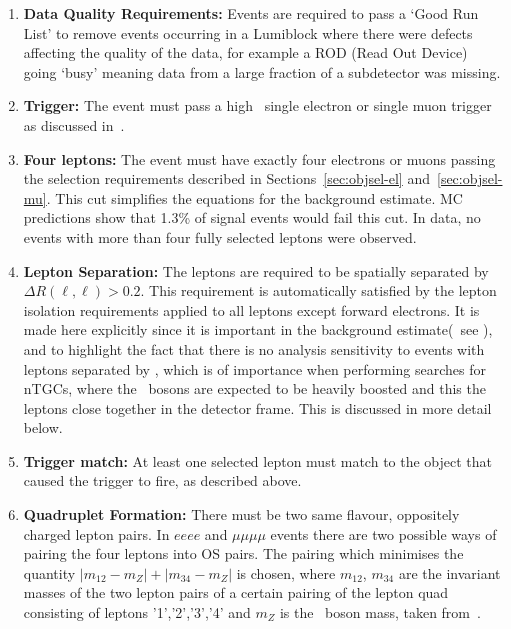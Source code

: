 \begin{enumerate}

    \item {\bf Data Quality Requirements:} Events are required to pass a `Good
    Run List' to remove events occurring in a Lumiblock where there were defects
    affecting the quality of the data, for example a ROD (Read Out Device) going `busy' meaning
    data from a large fraction of a subdetector was missing.

    \item {\bf Trigger:} The event must pass a high \pt\ single electron or single
    muon trigger as discussed in~.

    \item {\bf Four leptons:} The event must have exactly four electrons or muons
    passing the selection requirements described in Sections~\ref{sec:objsel-el}
    and~\ref{sec:objsel-mu}. This cut simplifies the equations for the background
    estimate. MC predictions show that 1.3\% of signal events would fail this cut. In
    data, no events with more than four fully selected leptons were observed.

    \item {\bf Lepton Separation:} The leptons are required to be spatially separated by
    $\Delta{R}(\ell,\ell)>0.2$. This requirement is automatically satisfied by
    the lepton isolation requirements applied to all leptons except forward
    electrons. It is made here explicitly since it is important in the
    background estimate(~see ), and to highlight the fact that there is no
    analysis sensitivity to events with leptons separated by ,
    which is of importance when performing searches for nTGCs, where the \Z\
    bosons are expected to be heavily boosted and this the leptons close
    together in the detector frame. This is discussed in more detail below.

    \item {\bf Trigger match:} At least one selected lepton must match to the
    object that caused the trigger to fire, as described above. 

    \item {\bf Quadruplet Formation:} There must be two same flavour,
    oppositely charged lepton pairs. In $eeee$ and $\mu\mu\mu\mu$ events there are
    two possible ways of pairing the four leptons into OS pairs. The pairing which
    minimises the quantity $|m_{12}-m_{Z}|+|m_{34}-m_{Z}|$ is chosen, where
    $m_{12}$, $m_{34}$ are the invariant masses of the two lepton pairs of a certain
    pairing of the lepton quad consisting of leptons '1','2','3','4' and $m_Z$ is
    the \Z\ boson mass, taken from~\cite{PDG}.


\end{enumerate}
